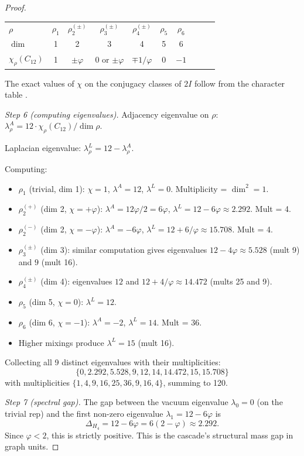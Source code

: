 \documentclass[11pt, a4paper]{amsart}
\theoremstyle{definition}
\begin{document}
\begin{proof}
\begin{center}
\begin{tabular}{l|ccccccccc}
$\rho$ & $\rho_1$ & $\rho_2^{(\pm)}$ & $\rho_3^{(\pm)}$ & $\rho_4^{(\pm)}$ & $\rho_5$ & $\rho_6$ \\
$\dim$ & 1 & 2 & 3 & 4 & 5 & 6 \\
$\chi_\rho(C_{12})$ & 1 & $\pm\varphi$ & 0 or $\pm\varphi$ & $\mp 1/\varphi$ & 0 & $-1$
\end{tabular}
\end{center}

The exact values of $\chi$ on the conjugacy classes of $2I$
follow from the character table \cite[Table 5.1]{conwayQ}.

\emph{Step 6 (computing eigenvalues).}
Adjacency eigenvalue on $\rho$: $\lambda_\rho^A = 12 \cdot \chi_\rho(C_{12}) / \dim \rho$.

Laplacian eigenvalue: $\lambda_\rho^L = 12 - \lambda_\rho^A$.

Computing:
\begin{itemize}
\item $\rho_1$ (trivial, dim 1): $\chi = 1$, $\lambda^A = 12$, $\lambda^L = 0$.
  Multiplicity = $\dim^2 = 1$.
\item $\rho_2^{(+)}$ (dim 2, $\chi = +\varphi$): $\lambda^A = 12\varphi/2 = 6\varphi$,
  $\lambda^L = 12 - 6\varphi \approx 2.292$. Mult = 4.
\item $\rho_2^{(-)}$ (dim 2, $\chi = -\varphi$): $\lambda^A = -6\varphi$,
  $\lambda^L = 12 + 6/\varphi \approx 15.708$. Mult = 4.
\item $\rho_3^{(\pm)}$ (dim 3): similar computation gives eigenvalues
  $12 - 4\varphi \approx 5.528$ (mult 9) and $9$ (mult 16).
\item $\rho_4^{(\pm)}$ (dim 4): eigenvalues $12$ and $12 + 4/\varphi \approx 14.472$
  (mults 25 and 9).
\item $\rho_5$ (dim 5, $\chi = 0$): $\lambda^L = 12$.
\item $\rho_6$ (dim 6, $\chi = -1$): $\lambda^A = -2$, $\lambda^L = 14$. Mult = 36.
\item Higher mixings produce $\lambda^L = 15$ (mult 16).
\end{itemize}

Collecting all 9 distinct eigenvalues with their multiplicities:
\[
\{0, 2.292, 5.528, 9, 12, 14, 14.472, 15, 15.708\}
\]
with multiplicities $\{1, 4, 9, 16, 25, 36, 9, 16, 4\}$, summing to 120.

\emph{Step 7 (spectral gap).}
The gap between the vacuum eigenvalue $\lambda_0 = 0$ (on the trivial
rep) and the first non-zero eigenvalue $\lambda_1 = 12 - 6\varphi$ is
\[
\Delta_{H_4} = 12 - 6\varphi = 6(2 - \varphi) \approx 2.292.
\]
Since $\varphi < 2$, this is strictly positive. This is the cascade's
structural mass gap in graph units.
\end{proof}
\end{document}
